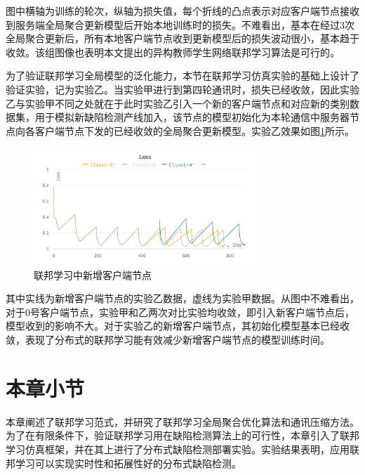 图中横轴为训练的轮次，纵轴为损失值，每个折线的凸点表示对应客户端节点接收到服务端全局聚合更新模型后开始本地训练时的损失。不难看出，基本在经过3次全局聚合更新后，所有本地客户端节点收到更新模型后的损失波动很小，基本趋于收敛。该组图像也表明本文提出的异构教师学生网络联邦学习算法是可行的。

为了验证联邦学习全局模型的泛化能力，本节在联邦学习仿真实验的基础上设计了验证实验，记为实验乙。当实验甲进行到第四轮通讯时，损失已经收敛，因此实验乙与实验甲不同之处就在于此时实验乙引入一个新的客户端节点和对应新的类别数据集，用于模拟新缺陷检测产线加入，该节点的模型初始化为本轮通信中服务器节点向各客户端节点下发的已经收敛的全局聚合更新模型。实验乙效果如图\ref{fig:add-5-client}所示。
\begin{figure}[htbp]
  \centering
  \includegraphics[width=0.75\textwidth]{figures/add-5-client.png}
  \caption{联邦学习中新增客户端节点}\label{fig:add-5-client}
\end{figure}

其中实线为新增客户端节点的实验乙数据，虚线为实验甲数据。从图中不难看出，对于0号客户端节点，实验甲和乙两次对比实验均收敛，即引入新客户端节点后，模型收到的影响不大。对于实验乙的新增客户端节点，其初始化模型基本已经收敛，表现了分布式的联邦学习能有效减少新增客户端节点的模型训练时间。

\section{本章小节}
本章阐述了联邦学习范式，并研究了联邦学习全局聚合优化算法和通讯压缩方法。为了在有限条件下，验证联邦学习用在缺陷检测算法上的可行性，本章引入了联邦学习仿真框架，并在其上进行了分布式缺陷检测部署实验。实验结果表明，应用联邦学习可以实现实时性和拓展性好的分布式缺陷检测。